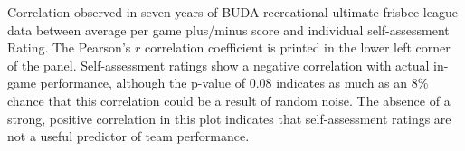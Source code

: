 Correlation observed in seven years of BUDA recreational ultimate frisbee league data between average per game plus/minus score and individual self-assessment Rating.  The Pearson's $r$ correlation coefficient is printed in the lower left corner of the panel. Self-assessment ratings show a negative correlation with actual in-game performance, although the p-value of 0.08 indicates as much as an 8\% chance that this correlation could be a result of random noise. The absence of a strong, positive correlation in this plot indicates that self-assessment ratings are not a useful predictor of team performance.